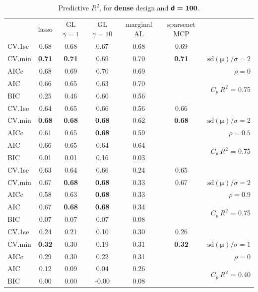 \documentclass[12pt]{article}
\newcommand{\mr}[1]{\mathrm{#1}}
\newcommand{\bm}[1]{\mathbf{#1}}
\begin{document}
\begin{table}[p]\vspace{-.5cm}
\caption[l]{ Predictive $R^2$, for {\bf dense} design and  $\boldsymbol{{\sf d}=100}$.}
\vspace{-.5cm}
\small{}
\begin{center}
\begin{tabular}{l*{5}{c}|r}
 & lasso & GL $\gamma=1$ & GL $\gamma=10$ & marginal AL & sparsenet MCP  &  \\
\cline{1-7}
CV.1se & 0.68 & 0.68 & 0.67 & 0.68 & 0.69 &\\
CV.min & {\bf 0.71} & {\bf 0.71} & 0.69 & 0.70 & {\bf 0.71} &  $\mr{sd}(\bm{\mu})/\sigma=2$ \\
AICc & 0.68 & 0.69 & 0.70 & 0.69 & & $\rho=0$ \\
AIC & 0.66 & 0.65 & 0.63 & 0.70 & & \multirow{2}{*}{$C_p ~ R^2$ = 0.75} \\
BIC & 0.25 & 0.46 & 0.60 & 0.56 & & \\
 \hline 
CV.1se & 0.64 & 0.65 & 0.66 & 0.56 & 0.66 &\\
CV.min & {\bf 0.68} & {\bf 0.68} & {\bf 0.68} & 0.62 & {\bf 0.68} &  $\mr{sd}(\bm{\mu})/\sigma=2$ \\
AICc & 0.61 & 0.65 & {\bf 0.68} & 0.59 & & $\rho=0.5$ \\
AIC & 0.66 & 0.65 & 0.64 & 0.64 & & \multirow{2}{*}{$C_p ~ R^2$ = 0.75} \\
BIC & 0.01 & 0.01 & 0.16 & 0.03 & & \\
 \hline 
CV.1se & 0.63 & 0.64 & 0.66 & 0.24 & 0.65 &\\
CV.min & 0.67 & {\bf 0.68} & {\bf 0.68} & 0.33 & 0.67 &  $\mr{sd}(\bm{\mu})/\sigma=2$ \\
AICc & 0.58 & 0.63 & {\bf 0.68} & 0.33 & & $\rho=0.9$ \\
AIC & 0.67 & {\bf 0.68} & {\bf 0.68} & 0.34 & & \multirow{2}{*}{$C_p ~ R^2$ = 0.75} \\
BIC & 0.07 & 0.07 & 0.07 & 0.08 & & \\
 \hline 
CV.1se & 0.24 & 0.21 & 0.10 & 0.30 & 0.26 &\\
CV.min & {\bf 0.32} & 0.30 & 0.19 & 0.31 & {\bf 0.32} &  $\mr{sd}(\bm{\mu})/\sigma=1$ \\
AICc & 0.29 & 0.30 & 0.22 & 0.31 & & $\rho=0$ \\
AIC & 0.12 & 0.09 & 0.04 & 0.26 & & \multirow{2}{*}{$C_p ~ R^2$ = 0.40} \\
BIC & 0.00 & 0.00 & -0.00 & 0.08 & & \\
 \hline 

\end{tabular}
\end{center}
\end{table}
\end{document}
